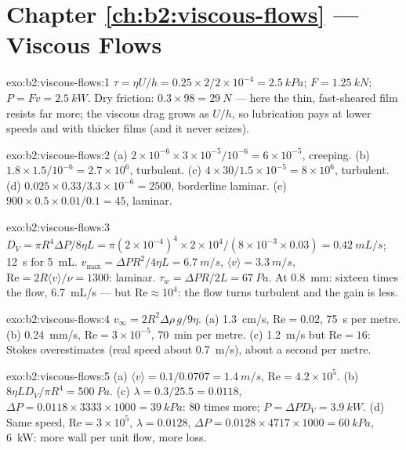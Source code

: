 \section*{Chapter \ref{ch:b2:viscous-flows} --- Viscous Flows}

\begin{solution}{exo:b2:viscous-flows:1}
$\tau = \eta U/h = 0.25 \times 2/2 \times 10^{-4} = \qty{2.5}{kPa}$; $F = \qty{1.25}{kN}$;
$P = Fv = \qty{2.5}{kW}$. Dry friction: $0.3 \times 98 = \qty{29}{N}$ --- here the
thin, fast-sheared film resists far more; the viscous drag grows as
$U/h$, so lubrication pays at lower speeds and with thicker films (and
it never seizes).
\end{solution}

\begin{solution}{exo:b2:viscous-flows:2}
(a) $2 \times 10^{-6} \times 3 \times 10^{-5}/10^{-6} = 6 \times 10^{-5}$, creeping. (b)
$1.8 \times 1.5/10^{-6} = 2.7 \times 10^6$, turbulent. (c) $4 \times 30/1.5 \times 10^{-5}
= 8 \times 10^6$, turbulent. (d) $0.025 \times 0.33/3.3 \times 10^{-6} = 2500$,
borderline laminar. (e) $900 \times 0.5 \times 0.01/0.1 = 45$, laminar.
\end{solution}

\begin{solution}{exo:b2:viscous-flows:3}
$D_V = \pi R^4\Delta P/8\eta L = \pi(2 \times 10^{-4})^4 \times 2 \times 10^4/(8 \times 10^{-3}
\times 0.03) = \qty{0.42}{mL/s}$; \qty{12}{s} for \qty{5}{mL}. $v_{\max} = \Delta PR^2/
4\eta L = \qty{6.7}{m/s}$, $\langle v\rangle = \qty{3.3}{m/s}$, $\mathrm{Re} = 2R\langle v
\rangle/\nu = 1300$: laminar. $\tau_w = \Delta PR/2L = \qty{67}{Pa}$. At \qty{0.8}{mm}:
sixteen times the flow, \qty{6.7}{mL/s} --- but $\mathrm{Re} \approx 10^4$: the flow
turns turbulent and the gain is less.
\end{solution}

\begin{solution}{exo:b2:viscous-flows:4}
$v_\infty = 2R^2\Delta\rho\,g/9\eta$. (a) \qty{1.3}{cm/s}, $\mathrm{Re} = 0.02$, \qty{75}{s}
per metre. (b) \qty{0.24}{mm/s}, $\mathrm{Re} = 3 \times 10^{-5}$, \qty{70}{min} per
metre. (c) \qty{1.2}{m/s} but $\mathrm{Re} = 16$: Stokes overestimates (real
speed about \qty{0.7}{m/s}), about a second per metre.
\end{solution}

\begin{solution}{exo:b2:viscous-flows:5}
(a) $\langle v\rangle = 0.1/0.0707 = \qty{1.4}{m/s}$, $\mathrm{Re} = 4.2 \times 10^5$. (b)
$8\eta LD_V/\pi R^4 = \qty{500}{Pa}$. (c) $\lambda = 0.3/25.5 = 0.0118$, $\Delta P = 0.0118
\times 3333 \times 1000 = \qty{39}{kPa}$: $80$ times more; $P = \Delta PD_V = \qty{3.9}{kW}$.
(d) Same speed, $\mathrm{Re} = 3 \times 10^5$, $\lambda = 0.0128$, $\Delta P = 0.0128 \times 4717
\times 1000 = \qty{60}{kPa}$, \qty{6}{kW}: more wall per unit flow, more loss.
\end{solution}

